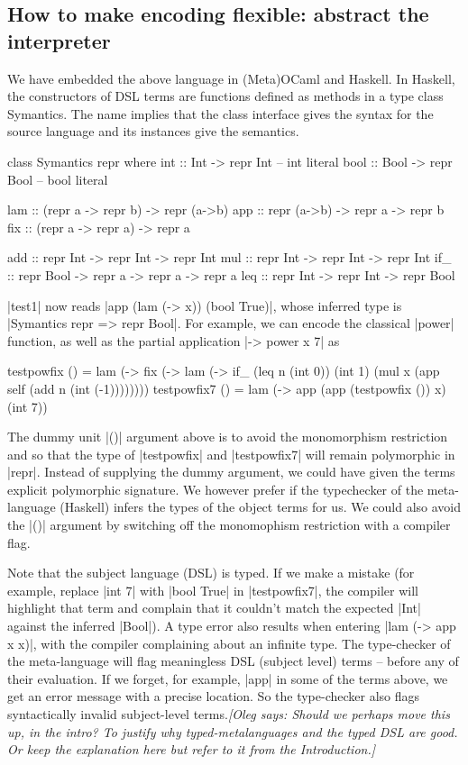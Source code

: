 \documentclass[preprint]{sigplanconf}
\newcommand{\oleg}[1]{{\it [Oleg says: #1]}}
\begin{document}
\subsection{How to make encoding flexible: abstract the interpreter}
\label{encoding}
We have embedded the above language in (Meta)OCaml and Haskell.  In Haskell,
the constructors of DSL terms are functions defined as methods in a type class
Symantics. The name implies that the class interface gives the syntax for
the source language and its instances give the semantics.

\begin{code}
class Symantics repr where
  int :: Int -> repr Int            -- int literal
  bool :: Bool -> repr Bool         -- bool literal

  lam :: (repr a -> repr b) -> repr (a->b)
  app :: repr (a->b) -> repr a -> repr b
  fix :: (repr a -> repr a) -> repr a

  add :: repr Int -> repr Int -> repr Int
  mul :: repr Int -> repr Int -> repr Int
  if_ :: repr Bool -> repr a -> repr a -> repr a
  leq :: repr Int -> repr Int -> repr Bool
\end{code}

|test1| now reads |app (lam (\x -> x)) (bool True)|,
whose inferred type is |Symantics repr => repr Bool|.
For example, we can encode the classical |power| function, as well
as the partial application |\x -> power x 7| as

\begin{code}
testpowfix () = 
  lam (\x -> fix (\self -> lam (\n ->
        if_ (leq n (int 0)) (int 1)
            (mul x (app self (add n (int (-1))))))))
testpowfix7 () = 
  lam (\x -> app (app (testpowfix ()) x) (int 7))
\end{code}
The dummy unit |()| argument above is to avoid the monomorphism
restriction and so that the type of |testpowfix| and |testpowfix7|
will remain polymorphic in |repr|. Instead of supplying the dummy
argument, we could have given the terms explicit polymorphic
signature.  We however prefer if the typechecker of the meta-language
(Haskell) infers the types of the object terms for us. We could also
avoid the |()| argument by switching off the monomophism restriction
with a compiler flag.

Note that the subject language (DSL) is typed. If we make a mistake
(for example, replace |int 7| with |bool True| in |testpowfix7|, the
compiler will highlight that term and complain that it couldn't match
the expected |Int| against the inferred |Bool|). A type error
also results when entering |lam (\x -> app x x)|, with the compiler
complaining about an infinite type. The type-checker of the
meta-language will flag meaningless DSL (subject level) terms --
before any of their evaluation. If we forget, for example, |app| in
some of the terms above, we get an error message with a precise
location. So the type-checker also flags syntactically invalid
subject-level terms.\oleg{Should we perhaps move this up, in the
  intro? To justify why typed-metalanguages and the typed DSL are
  good. Or keep the explanation here but refer to it from the Introduction.}
\end{document}
